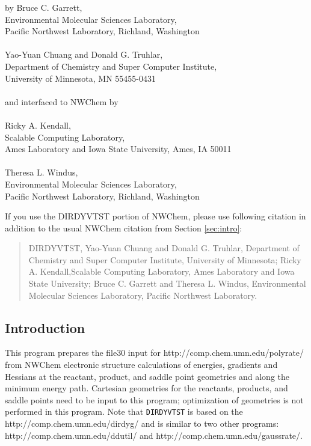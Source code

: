 by Bruce C. Garrett,\\
Environmental Molecular Sciences Laboratory,\\
Pacific Northwest Laboratory, Richland, Washington\\
\\
Yao-Yuan Chuang and Donald G. Truhlar,\\
Department of Chemistry and Super Computer Institute,\\
University of Minnesota, MN 55455-0431\\
\\
and interfaced to NWChem by\\
\\
Ricky A. Kendall,\\
Scalable Computing Laboratory,\\
Ames Laboratory and Iowa State University, Ames, IA 50011\\
\\
Theresa L. Windus,\\
Environmental Molecular Sciences Laboratory,\\
Pacific Northwest Laboratory, Richland, Washington

If you use the DIRDYVTST portion of NWChem, please use following citation
in addition to the usual NWChem citation from Section \ref{sec:intro}:
\begin{quote}
  DIRDYVTST, Yao-Yuan Chuang and Donald G. Truhlar,
  Department of Chemistry and Super Computer Institute,
  University of Minnesota; Ricky A. Kendall,Scalable Computing Laboratory,
  Ames Laboratory and Iowa State University; Bruce C. Garrett and Theresa L.
  Windus, Environmental Molecular Sciences Laboratory, Pacific Northwest
  Laboratory.
\end{quote}

\subsection{Introduction}

This program prepares the file30 input for 
{http://comp.chem.umn.edu/polyrate/} from NWChem
electronic structure calculations of energies, gradients and Hessians at the 
reactant, product, and saddle point geometries and along the minimum
energy path.  Cartesian geometries for the reactants, products, and 
saddle points need to be input to this program; optimization of 
geometries is not performed in this program.  Note that \verb+DIRDYVTST+ is
based on the  
{http://comp.chem.umn.edu/dirdyg/}
and is similar to two other programs: 
{http://comp.chem.umn.edu/ddutil/} and 
{http://comp.chem.umn.edu/gaussrate/}.

